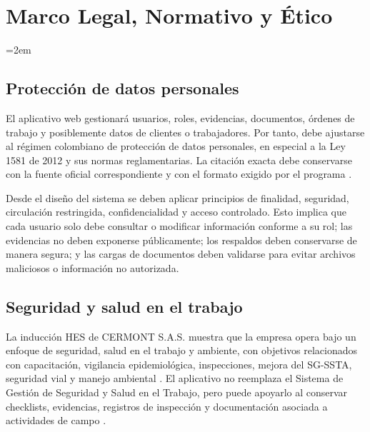 
\chapter{Marco Legal, Normativo y Ético}
\label{ch:marco-legal}

\setlength{\parindent}{0pt}
\setlength{\parskip}{6pt}
\sloppy
\emergencystretch=2em
\raggedbottom
\section{Protección de datos personales}

El aplicativo web gestionará usuarios, roles, evidencias, documentos, órdenes de trabajo y posiblemente datos de clientes o trabajadores. Por tanto, debe ajustarse al régimen colombiano de protección de datos personales, en especial a la Ley 1581 de 2012 y sus normas reglamentarias. La citación exacta debe conservarse con la fuente oficial correspondiente y con el formato exigido por el programa \cite{congreso2012,decreto2013}.

Desde el diseño del sistema se deben aplicar principios de finalidad, seguridad, circulación restringida, confidencialidad y acceso controlado. Esto implica que cada usuario solo debe consultar o modificar información conforme a su rol; las evidencias no deben exponerse públicamente; los respaldos deben conservarse de manera segura; y las cargas de documentos deben validarse para evitar archivos maliciosos o información no autorizada.

\section{Seguridad y salud en el trabajo}

La inducción HES de CERMONT S.A.S. muestra que la empresa opera bajo un enfoque de seguridad, salud en el trabajo y ambiente, con objetivos relacionados con capacitación, vigilancia epidemiológica, inspecciones, mejora del SG-SSTA, seguridad vial y manejo ambiental \cite{cermont_hes}. El aplicativo no reemplaza el Sistema de Gestión de Seguridad y Salud en el Trabajo, pero puede apoyarlo al conservar checklists, evidencias, registros de inspección y documentación asociada a actividades de campo \cite{ministerio2015,ministerio2019}.

